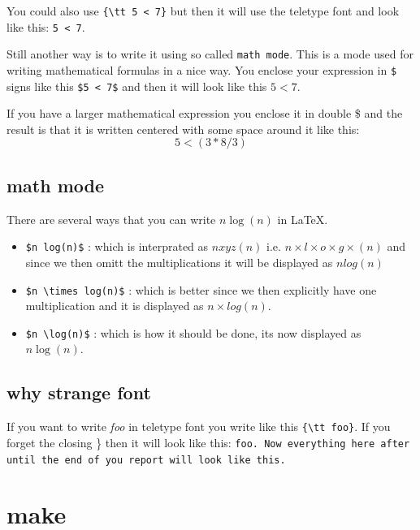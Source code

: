 \documentclass[a4paper,11pt]{article}
\begin{document}
You could also use {\tt \{\textbackslash tt 5 < 7\}} but then it
will use the teletype font and look like this: {\tt 5 < 7}.

Still another way is to write it using so called {\tt math mode}. This
is a mode used for writing mathematical formulas in a nice way. You
enclose your expression in {\tt \$} signs like this {\tt \$5 < 7\$}
and then it will look like this $5 < 7$.

If you have a larger mathematical expression you enclose it in double
\$ and the result is that it is written centered with some space
around it like this:  $$ 5 < (3 * 8 / 3 ) $$

\subsection{math mode}

There are several ways that you can write $n \log(n)$ in \LaTeX.

\begin{itemize}
\item {\tt \$n log(n)\$}  : which is interprated as $n xyz(n)$ i.e. $n \times l \times o \times g \times (n)$ and since we then omitt the multiplications it will be displayed as $n log(n)$

\item {\tt \$n \textbackslash times log(n)\$} : which is better since
  we then explicitly have one multiplication and it is displayed as
  $n \times log(n)$.

\item {\tt \$n \textbackslash log(n)\$} : which is how it should be
  done, its now displayed as $n \log(n)$.
\end{itemize}  



\subsection*{why strange font}

If you want to write {\em foo} in teletype font you write like this
\verb+{\tt foo}+. If you forget the closing \} then it will look like
this: {\tt foo. Now everything here after until the end of you report
  will look like this. }



\section*{make}
\end{document}
